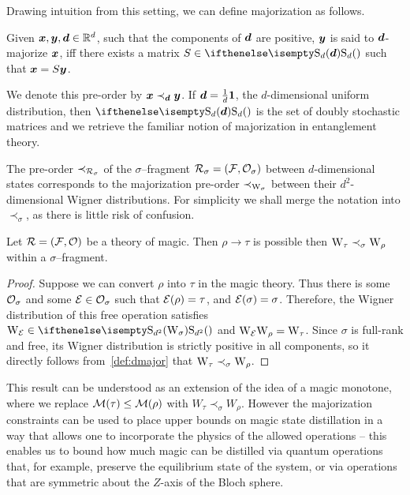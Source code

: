 \documentclass[pra,
aps,
twocolumn,
superscriptaddress,
groupedaddress,
nofootinbib,
reprint
]{revtex4-1}
\begin{document}
Drawing intuition from this setting, we can define majorization as follows.
\begin{definition}\label{def:dmajor}
    Given $\bm{x}, \bm{y}, \bm{d} \in \mathbb{R}^d$, such that the components of $\bm{d}$ are positive, $\bm{y}$ is said to $\bm{d}$-majorize $\bm{x}$, iff there exists a matrix $S \in \stoch$ such that $\bm{x} = S\bm{y}$.
\end{definition}
We denote this pre-order by $\bm{x} \prec_{\bm{d}} \bm{y}$.
If $\bm{d} = \frac{1}{d}\bm{1}$, the $d$-dimensional uniform distribution, then $\stoch$ is the set of doubly stochastic matrices and we retrieve the familiar notion of majorization in entanglement theory. 

The pre-order $\prec_{\mathcal{R}_\sigma}$ of the $\sigma$--fragment $\mathcal{R}_\sigma = (\mathcal{F}, \mathcal{O}_\sigma)$ between $d$-dimensional states corresponds to the majorization pre-order $\prec_{\W{\sigma}}$ between their $d^2$-dimensional Wigner distributions.
For simplicity we shall merge the notation into $\prec_\sigma$, as there is little risk of confusion.


\begin{theorem}\label{thm:sigmamajor}
    Let $\mathcal{R} = (\mathcal{F}, \mathcal{O})$ be a theory of magic. Then $\rho \longrightarrow \tau$ is possible then  $\W{\tau} \prec_\sigma \W{\rho}$ within a $\sigma$--fragment.
\end{theorem}
\begin{proof}Suppose we can convert $\rho$ into $\tau$ in the magic theory. Thus there is some $\mathcal{O}_\sigma$ and some $\mathcal{E} \in \mathcal{O}_\sigma$ such that $\mathcal{E}(\rho) = \tau$, and $\mathcal{E}(\sigma)=\sigma$. Therefore, the Wigner distribution of this free operation satisfies $\W{\E} \in \stochw$ and $\W{\E}\W{\rho} = \W{\tau}$. Since $\sigma$ is full-rank and free, its Wigner distribution is strictly positive in all components, so it directly follows from~\cref{def:dmajor} that $\W{\tau} \prec_{\sigma} \W{\rho}$.
\end{proof}
This result can be understood as an extension of the idea of a magic monotone, where we replace $\mathcal{M}(\tau) \le \mathcal{M}(\rho)$ with $W_\tau \prec_\sigma W_\rho$. However the majorization constraints can be used to place upper bounds on magic state distillation in a way that allows one to incorporate the physics of the allowed operations -- this enables us to bound how much magic can be distilled via quantum operations that, for example, preserve the equilibrium state of the system, or via operations that are symmetric about the $Z$-axis of the Bloch sphere.
\end{document}

